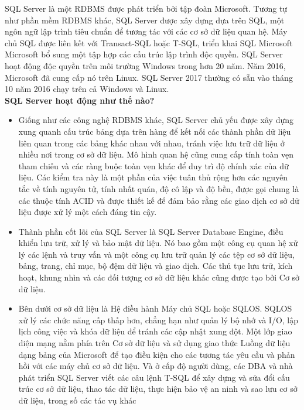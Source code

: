 SQL Server là một RDBMS được phát triển bởi tập đoàn Microsoft. Tương tự như phần mềm RDBMS khác, SQL Server được xây dựng dựa trên SQL, một ngôn ngữ lập trình tiêu chuẩn để tương tác với các cơ sở dữ liệu quan hệ. Máy chủ SQL được liên kết với Transact-SQL hoặc T-SQL, triển khai SQL Microsoft Microsoft bổ sung một tập hợp các cấu trúc lập trình độc quyền. SQL Server hoạt động độc quyền trên môi trường Windows trong hơn 20 năm. Năm 2016, Microsoft đã cung cấp nó trên Linux. SQL Server 2017 thường có sẵn vào tháng 10 năm 2016 chạy trên cả Windows và Linux.\\
\newline
\textbf{SQL Server hoạt động như thế nào?}
\begin{itemize}
    \item Giống như các công nghệ RDBMS khác, SQL Server chủ yếu được xây dựng xung quanh cấu trúc bảng dựa trên hàng để kết nối các thành phần dữ liệu liên quan trong các bảng khác nhau với nhau, tránh việc lưu trữ dữ liệu ở nhiều nơi trong cơ sở dữ liệu. Mô hình quan hệ cũng cung cấp tính toàn vẹn tham chiếu và các ràng buộc toàn vẹn khác để duy trì độ chính xác của dữ liệu. Các kiểm tra này là một phần của việc tuân thủ rộng hơn các nguyên tắc về tính nguyên tử, tính nhất quán, độ cô lập và độ bền, được gọi chung là các thuộc tính ACID và được thiết kế để đảm bảo rằng các giao dịch cơ sở dữ liệu được xử lý một cách đáng tin cậy.
    \item Thành phần cốt lõi của SQL Server là SQL Server Database Engine, điều khiển lưu trữ, xử lý và bảo mật dữ liệu. Nó bao gồm một công cụ quan hệ xử lý các lệnh và truy vấn và một công cụ lưu trữ quản lý các tệp cơ sở dữ liệu, bảng, trang, chỉ mục, bộ đệm dữ liệu và giao dịch. Các thủ tục lưu trữ, kích hoạt, khung nhìn và các đối tượng cơ sở dữ liệu khác cũng được tạo bởi Cơ sở dữ liệu.
    \item Bên dưới cơ sở dữ liệu là Hệ điều hành Máy chủ SQL hoặc SQLOS. SQLOS xử lý các chức năng cấp thấp hơn, chẳng hạn như quản lý bộ nhớ và I/O, lập lịch công việc và khóa dữ liệu để tránh các cập nhật xung đột. Một lớp giao diện mạng nằm phía trên Cơ sở dữ liệu và sử dụng giao thức Luồng dữ liệu dạng bảng của Microsoft để tạo điều kiện cho các tương tác yêu cầu và phản hồi với các máy chủ cơ sở dữ liệu. Và ở cấp độ người dùng, các DBA và nhà phát triển SQL Server viết các câu lệnh T-SQL để xây dựng và sửa đổi cấu trúc cơ sở dữ liệu, thao tác dữ liệu, thực hiện bảo vệ an ninh và sao lưu cơ sở dữ liệu, trong số các tác vụ khác
\end{itemize}
